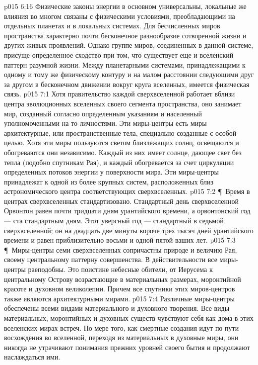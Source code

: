 \vs p015 6:16 Физические законы энергии в основном универсальны, локальные же влияния во многом связаны с физическими условиями, преобладающими на отдельных планетах и в локальных системах. Для бесчисленных миров пространства характерно почти бесконечное разнообразие сотворенной жизни и других живых проявлений. Однако группе миров, соединенных в данной системе, присуще определенное сходство при том, что существует еще и вселенский паттерн разумной жизни. Между планетарными системами, принадлежащими к одному и тому же физическому контуру и на малом расстоянии следующими друг за другом в бесконечном движении вокруг круга вселенных, имеется физическая связь.
\vs p015 7:1 Хотя правительство каждой сверхвселенной работает вблизи центра эволюционных вселенных своего сегмента пространства, оно занимает мир, созданный согласно определенным указаниям и населенный уполномоченными на то личностями. Эти миры\hyp{}центры есть миры архитектурные, или пространственные тела, специально созданные с особой целью. Хотя эти миры пользуются светом близлежащих солнц, освещаются и обогреваются они независимо. Каждый из них имеет солнце, дающее свет без тепла (подобно спутникам Рая), и каждый обогревается за счет циркуляции определенных потоков энергии у поверхности мира. Эти миры\hyp{}центры принадлежат к одной из более крупных систем, расположенных близ астрономического центра соответствующих сверхвселенных.
\vs p015 7:2 \P\ Время в центрах сверхвселенных стандартизовано. Стандартный день сверхвселенной Орвонтон равен почти тридцати дням урантийского времени, а орвонтонский год --- ста стандартным дням. Этот уверсный год --- стандартный в седьмой сверхвселенной; он на двадцать две минуты короче трех тысяч дней урантийского времени и равен приблизительно восьми и одной пятой ваших лет.
\vs p015 7:3 \P\ Миры\hyp{}центры семи сверхвселенных сопричастны природе и величию Рая, своему центральному паттерну совершенства. В действительности все миры\hyp{}центры раеподобны. Это поистине небесные обители, от Иерусема к центральному Острову возрастающие в материальных размерах, моронтийной красоте и духовном великолепии. Причем все спутники этих миров\hyp{}центров также являются архитектурными мирами.
\vs p015 7:4 Различные миры\hyp{}центры обеспечены всеми видами материального и духовного творения. Все виды материальных, моронтийных и духовных существ чувствуют себя как дома в этих вселенских мирах встреч. По мере того, как смертные создания идут по пути восхождения во вселенной, переходя из материальных в духовные миры, они никогда не утрачивают понимания прежних уровней своего бытия и продолжают наслаждаться ими.
